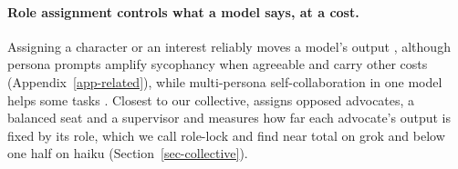 \paragraph{Role assignment controls what a model says, at a cost.}
Assigning a character or an interest reliably moves a model's output
\citep{shanahan2023roleplay,li2023camel}, although persona prompts amplify sycophancy when
agreeable \citep{shah2026toonice} and carry other costs (Appendix~\ref{app-related}),
while multi-persona self-collaboration in one
model helps some tasks \citep{wang2024spp}. Closest to our
collective, \citet{dietrich2026roles} assigns opposed advocates, a balanced
seat and a supervisor and measures how far each advocate's output is fixed by
its role, which we call role-lock and find near total on grok and below one
half on haiku (Section~\ref{sec-collective}).

